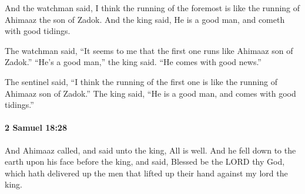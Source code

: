 			\begin{versebox}
					\item[BHS] 
					\item[ASV] And the watchman said, I think the running of the foremost is like the running of Ahimaaz the son of Zadok. And the king said, He is a good man, and cometh with good tidings.
					\item[NIV] The watchman said, “It seems to me that the first one runs like Ahimaaz son of Zadok.” “He’s a good man,” the king said. “He comes with good news.”
					\item[NRSV] The sentinel said, “I think the running of the first one is like the running of Ahimaaz son of Zadok.” The king said, “He is a good man, and comes with good tidings.”
			\end{versebox}

		\paragraph{2 Samuel 18:28} %
			\label{2SAMUEL-18-28}

			And Ahimaaz called, and said unto the king, All is well. And he fell down to the earth upon his face before the king, and said, Blessed be the LORD thy God, which hath delivered up the men that lifted up their hand against my lord the king.

